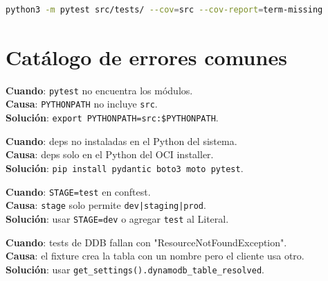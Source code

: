 \documentclass[11pt,a4paper,oneside]{article}
\begin{document}
\begin{lstlisting}[language=bash,caption={Con coverage}]
python3 -m pytest src/tests/ --cov=src --cov-report=term-missing
\end{lstlisting}

\section{Cat\'alogo de errores comunes}

\begin{tcolorbox}[colback=errred!5!white,colframe=errred,breakable,title={Error 1: ModuleNotFoundError}]
\textbf{Cuando}: \texttt{pytest} no encuentra los m\'odulos. \\
\textbf{Causa}: \texttt{PYTHONPATH} no incluye \texttt{src}. \\
\textbf{Soluci\'on}: \texttt{export PYTHONPATH=src:\$PYTHONPATH}.
\end{tcolorbox}

\begin{tcolorbox}[colback=errred!5!white,colframe=errred,breakable,title={Error 2: ModuleNotFoundError: No module named 'pydantic'}]
\textbf{Cuando}: deps no instaladas en el Python del sistema. \\
\textbf{Causa}: deps solo en el Python del OCI installer. \\
\textbf{Soluci\'on}: \texttt{pip install pydantic boto3 moto pytest}.
\end{tcolorbox}

\begin{tcolorbox}[colback=errred!5!white,colframe=errred,breakable,title={Error 3: Settings ValidationError}]
\textbf{Cuando}: \texttt{STAGE=test} en conftest. \\
\textbf{Causa}: \texttt{stage} solo permite \texttt{dev|staging|prod}. \\
\textbf{Soluci\'on}: usar \texttt{STAGE=dev} o agregar \texttt{test} al Literal.
\end{tcolorbox}

\begin{tcolorbox}[colback=errred!5!white,colframe=errred,breakable,title={Error 4: Table not found}]
\textbf{Cuando}: tests de DDB fallan con "ResourceNotFoundException". \\
\textbf{Causa}: el fixture crea la tabla con un nombre pero el cliente usa otro. \\
\textbf{Soluci\'on}: usar \texttt{get\_settings().dynamodb\_table\_resolved}.
\end{tcolorbox}
\end{document}
